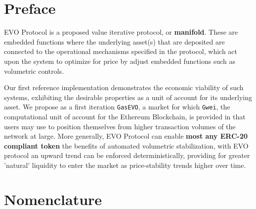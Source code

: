 
\chapter*{Preface}

EVO Protocol is a proposed value iterative protocol, or \textbf{manifold}.
These are embedded functions where the underlying asset(s) that are deposited are connected to the operational mechanisms specified in the protocol, which act upon the system to optimize for price by adjust embedded functions such as volumetric controls.\\
    \vspace{2mm}
    
Our first reference implementation demonstrates the economic viability of such systems, exhibiting the desirable properties as a unit of account for its underlying asset.
We propose as a first iteration \texttt{GasEVO}, a market for  which \texttt{Gwei}, the computational unit of account for the Ethereum Blockchain, is provided in that users may use to position themselves from higher transaction volumes of the network at large.
  \vspace{2mm}
More generally, EVO Protocol can enable \textbf{most any ERC-20 compliant token} the benefits of automated volumetric stabilization, with EVO protocol an upward trend can be enforced deterministically, providing for greater 'natural' liquidity to enter the market as price-stability trends higher over time. 


 \cleardoublepage


 \setcounter{tocdepth}{2}
 \tableofcontents

 \cleardoublepage



\chapter*{Nomenclature}\label{chap:symbole}

